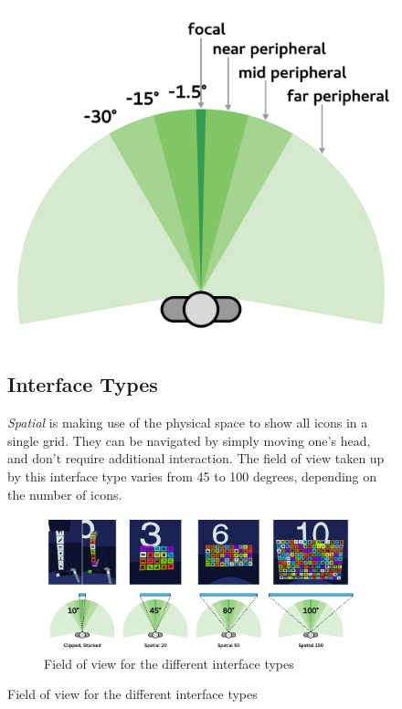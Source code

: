 \documentclass{tufte-book} %
\begin{document}
\begin{figure}
\begin{marginfigure}
  \includegraphics[width=\linewidth]{visual-field.png}
  \caption{Diagram of the human field of view}
  \label{fig:visual-field}
\end{marginfigure}

\subsection{Interface Types}

\emph{Spatial} is making use of the physical space to show all icons in a single grid. They can be navigated by simply moving one's head, and don't require additional interaction. The field of view taken up by this interface type varies from 45 to 100 degrees, depending on the number of icons.

\begin{figure}[h]
\includegraphics[width=\linewidth]{fov-types.png}
\caption{Field of view for the different interface types}
\label{fig:fov-types}
\end{figure}


\end{figure}
\end{document}
